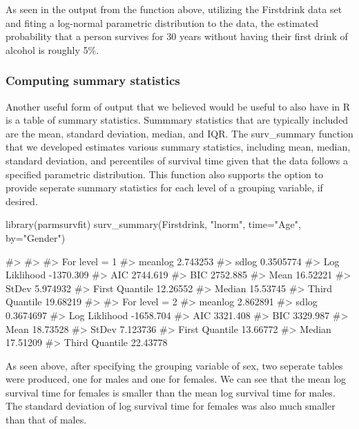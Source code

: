 As seen in the output from the function above, utilizing the Firstdrink
data set and fiting a log-normal parametric distribution to the data,
the estimated probability that a person survives for 30 years without
having their first drink of alcohol is roughly 5\%.

\hypertarget{computing-summary-statistics}{%
\subsubsection{Computing summary
statistics}\label{computing-summary-statistics}}

Another useful form of output that we believed would be useful to also
have in R is a table of summary statistics. Summmary statistics that are
typically included are the mean, standard deviation, median, and IQR.
The surv\_summary function that we developed estimates various summary
statistics, including mean, median, standard deviation, and percentiles
of survival time given that the data follows a specified parametric
distribution. This function also supports the option to provide seperate
summary statistics for each level of a grouping variable, if desired.

\begin{Schunk}
\begin{Sinput}
library(parmsurvfit)
surv_summary(Firstdrink, "lnorm", time="Age", by="Gender")
\end{Sinput}
\begin{Soutput}
#> 
#> 
#> For level = 1 
#> meanlog      2.743253
#> sdlog        0.3505774
#> Log Liklihood    -1370.309
#> AIC      2744.619
#> BIC      2752.885
#> Mean     16.52221
#> StDev        5.974932
#> First Quantile   12.26552
#> Median       15.53745
#> Third Quantile   19.68219
#> 
#> For level = 2 
#> meanlog      2.862891
#> sdlog        0.3674697
#> Log Liklihood    -1658.704
#> AIC      3321.408
#> BIC      3329.987
#> Mean     18.73528
#> StDev        7.123736
#> First Quantile   13.66772
#> Median       17.51209
#> Third Quantile   22.43778
\end{Soutput}
\end{Schunk}

As seen above, after specifying the grouping variable of sex, two
seperate tables were produced, one for males and one for females. We can
see that the mean log survival time for females is smaller than the mean
log survival time for males. The standard deviation of log survival time
for females was also much smaller than that of males.

